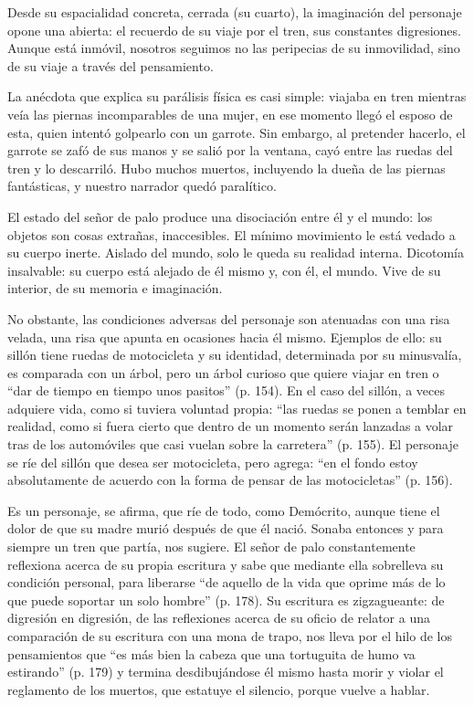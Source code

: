 \documentclass[14pt,twoside,final]{extbook} %
\begin{document}
Desde su espacialidad concreta, cerrada (su cuarto), la imaginación del personaje opone una abierta: el recuerdo de su viaje por el tren, sus constantes digresiones. Aunque está inmóvil, nosotros seguimos no las peripecias de su inmovilidad, sino de su viaje a través del pensamiento.

La anécdota que explica su parálisis física es casi simple: viajaba en tren mientras veía las piernas incomparables de una mujer, en ese momento llegó el esposo de esta, quien intentó golpearlo con un garrote. Sin embargo, al pretender hacerlo, el garrote se zafó de sus manos y se salió por la ventana, cayó entre las ruedas del tren y lo descarriló. Hubo muchos muertos, incluyendo la dueña de las piernas fantásticas, y nuestro narrador quedó paralítico.

El estado del señor de palo produce una disociación entre él y el mundo: los objetos son cosas extrañas, inaccesibles. El mínimo movimiento le está vedado a su cuerpo inerte. Aislado del mundo, solo le queda su realidad interna. Dicotomía insalvable: su cuerpo está alejado de él mismo y, con él, el mundo. Vive de su interior, de su memoria e imaginación.

No obstante, las condiciones adversas del personaje son atenuadas con una risa velada, una risa que apunta en ocasiones hacia él mismo. Ejemplos de ello: su sillón tiene ruedas de motocicleta y su identidad, determinada por su minusvalía, es comparada con un árbol, pero un árbol curioso que quiere viajar en tren o ``dar de tiempo en tiempo unos pasitos'' (p. 154). En el caso del sillón, a veces adquiere vida, como si tuviera voluntad propia: ``las ruedas se ponen a temblar en realidad, como si fuera cierto que dentro de un momento serán lanzadas a volar tras de los automóviles que casi vuelan sobre la carretera'' (p. 155). El personaje se ríe del sillón que desea ser motocicleta, pero agrega: ``en el fondo estoy absolutamente de acuerdo con la forma de pensar de las motocicletas'' (p. 156).

Es un personaje, se afirma, que ríe de todo, como Demócrito, aunque tiene el dolor de que su madre murió después de que él nació. Sonaba entonces y para siempre un tren que partía, nos sugiere. El señor de palo constantemente reflexiona acerca de su propia escritura y sabe que mediante ella sobrelleva su condición personal, para liberarse ``de aquello de la vida que oprime más de lo que puede soportar un solo hombre'' (p. 178). Su escritura es zigzagueante: de digresión en digresión, de las reflexiones acerca de su oficio de relator a una comparación de su escritura con una mona de trapo, nos lleva por el hilo de los pensamientos que ``es más bien la cabeza que una tortuguita de humo va estirando'' (p. 179) y termina desdibujándose él mismo hasta morir y violar el reglamento de los muertos, que estatuye el silencio, porque vuelve a hablar.
\end{document}
